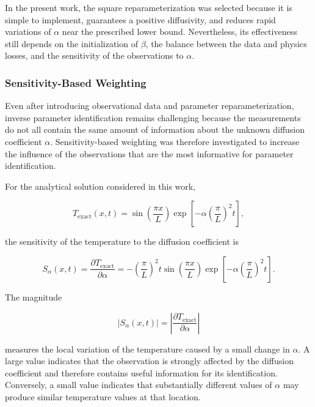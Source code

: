 In the present work, the square reparameterization was selected because it is
simple to implement, guarantees a positive diffusivity, and reduces rapid
variations of $\alpha$ near the prescribed lower bound. Nevertheless, its
effectiveness still depends on the initialization of $\beta$, the balance
between the data and physics losses, and the sensitivity of the observations
to $\alpha$.

\subsubsection{Sensitivity-Based Weighting}

Even after introducing observational data and parameter reparameterization,
inverse parameter identification remains challenging because the measurements do
not all contain the same amount of information about the unknown diffusion
coefficient $\alpha$. Sensitivity-based weighting was therefore investigated to
increase the influence of the observations that are the most informative for
parameter identification.

For the analytical solution considered in this work,

\begin{equation}
T_{\mathrm{exact}}(x,t)
=
\sin\left(\frac{\pi x}{L}\right)
\exp\left[
-\alpha
\left(\frac{\pi}{L}\right)^2 t
\right],
\end{equation}

the sensitivity of the temperature to the diffusion coefficient is

\begin{equation}
S_{\alpha}(x,t)
=
\frac{\partial T_{\mathrm{exact}}}{\partial \alpha}
=
-
\left(\frac{\pi}{L}\right)^2
t
\sin\left(\frac{\pi x}{L}\right)
\exp\left[
-\alpha
\left(\frac{\pi}{L}\right)^2 t
\right].
\end{equation}

The magnitude

\begin{equation}
\left|S_{\alpha}(x,t)\right|
=
\left|
\frac{\partial T_{\mathrm{exact}}}{\partial\alpha}
\right|
\end{equation}

measures the local variation of the temperature caused by a small change in
$\alpha$. A large value indicates that the observation is strongly affected by
the diffusion coefficient and therefore contains useful information for its
identification. Conversely, a small value indicates that substantially different
values of $\alpha$ may produce similar temperature values at that location.

